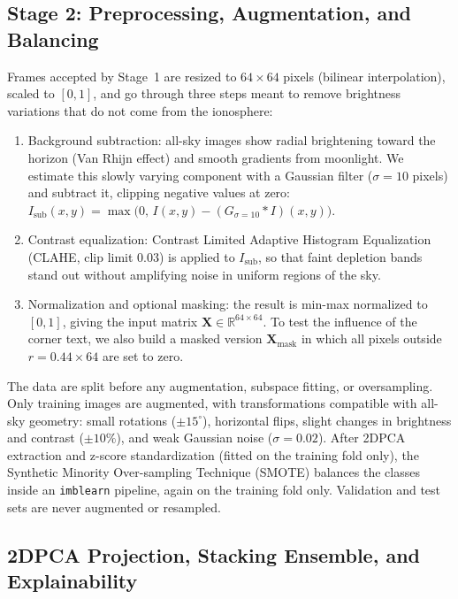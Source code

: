 \subsection{Stage 2: Preprocessing, Augmentation, and Balancing}\label{sec:stage2}

Frames accepted by Stage~1 are resized to $64 \times 64$ pixels (bilinear interpolation), scaled to $[0, 1]$, and go through three steps meant to remove brightness variations that do not come from the ionosphere:
\begin{enumerate}
    \item Background subtraction: all-sky images show radial brightening toward the horizon (Van Rhijn effect) and smooth gradients from moonlight. We estimate this slowly varying component with a Gaussian filter ($\sigma = 10$ pixels) and subtract it, clipping negative values at zero: $I_{\text{sub}}(x,y) = \max\!\big(0,\, I(x,y) - (G_{\sigma=10} * I)(x,y)\big)$.
    \item Contrast equalization: Contrast Limited Adaptive Histogram Equalization (CLAHE, clip limit $0.03$) is applied to $I_{\text{sub}}$, so that faint depletion bands stand out without amplifying noise in uniform regions of the sky.
    \item Normalization and optional masking: the result is min-max normalized to $[0, 1]$, giving the input matrix $\mathbf{X} \in \mathbb{R}^{64 \times 64}$. To test the influence of the corner text, we also build a masked version $\mathbf{X}_{\text{mask}}$ in which all pixels outside $r = 0.44 \times 64$ are set to zero.
\end{enumerate}

The data are split before any augmentation, subspace fitting, or oversampling. Only training images are augmented, with transformations compatible with all-sky geometry: small rotations ($\pm 15^\circ$), horizontal flips, slight changes in brightness and contrast ($\pm 10\%$), and weak Gaussian noise ($\sigma = 0.02$). After 2DPCA extraction and z-score standardization (fitted on the training fold only), the Synthetic Minority Over-sampling Technique (SMOTE) \cite{chawla2002smote} balances the classes inside an \texttt{imblearn} pipeline, again on the training fold only. Validation and test sets are never augmented or resampled.

\subsection{2DPCA Projection, Stacking Ensemble, and Explainability}\label{sec:model}

